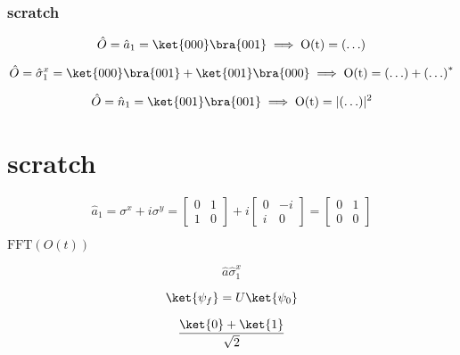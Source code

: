 \subsubsection{scratch}
\begin{equation}
    \hat{O}=\hat{a}_1 = \ket{000}\bra{001} \implies \textrm{O(t)} = \left( \mathellipsis \right)
\end{equation}

\begin{equation}
    \hat{O}=\hat{\sigma}^x_1 = \ket{000}\bra{001} + \ket{001}\bra{000} \implies \textrm{O(t)} = \left( \mathellipsis \right) + \left(  \mathellipsis  \right)^{*}
\end{equation}

\begin{equation}
    \hat{O}=\hat{n}_1 = \ket{001}\bra{001} \implies \textrm{O(t)} = \lvert \left( \mathellipsis \right) \rvert^{2}
\end{equation}



\section{scratch}

\begin{equation}
    \hat{a}_1 = \sigma^{x} + i \sigma^{y} =
    \begin{bmatrix}
        0 & 1 \\
        1 & 0
    \end{bmatrix}
    +
    i
    \begin{bmatrix}
        0 & -i \\
        i & 0
    \end{bmatrix}
    =
    \begin{bmatrix}
        0 & 1 \\
        0 & 0
    \end{bmatrix}
\end{equation}

$\text{FFT}\left( O(t) \right)$

\begin{equation}
    \hat{a}
    \hat{\sigma}^{x}_{1}
\end{equation}

\begin{equation}
    \ket{\psi_{f}} = U \ket{\psi_{0}}
\end{equation}

\begin{equation}
    \frac{\ket{0} + \ket{1}}{\sqrt{2}}
\end{equation}


